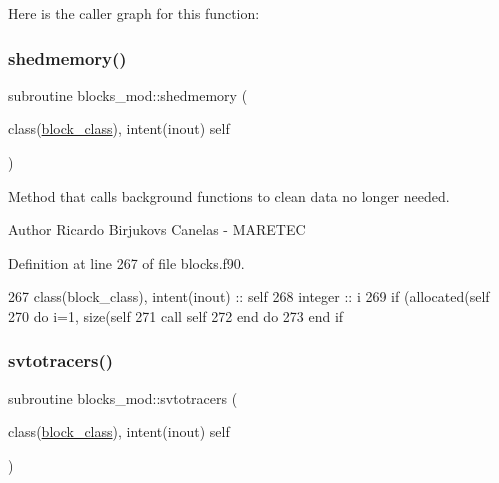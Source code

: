 Here is the caller graph for this function\+:
\mbox{\label{namespaceblocks__mod_a04a9fab577b0d1fb6cabefcde2b2180d}} 
\subsubsection{\texorpdfstring{shedmemory()}{shedmemory()}}
{\footnotesize\ttfamily subroutine blocks\+\_\+mod\+::shedmemory (\begin{DoxyParamCaption}\item[{class(\mbox{\hyperlink{structblocks__mod_1_1block__class}{block\+\_\+class}}), intent(inout)}]{self }\end{DoxyParamCaption})\hspace{0.3cm}{\ttfamily [private]}}



Method that calls background functions to clean data no longer needed. 

\begin{DoxyAuthor}{Author}
Ricardo Birjukovs Canelas -\/ M\+A\+R\+E\+T\+EC 
\end{DoxyAuthor}


Definition at line 267 of file blocks.\+f90.


\begin{DoxyCode}
267     \textcolor{keywordtype}{class}(block\_class), \textcolor{keywordtype}{intent(inout)} :: self
268     \textcolor{keywordtype}{integer} :: i
269     \textcolor{keywordflow}{if} (\textcolor{keyword}{allocated}(self%
270         \textcolor{keywordflow}{do} i=1, \textcolor{keyword}{size}(self%
271             \textcolor{keyword}{call }self%
272 \textcolor{keywordflow}{        end do}
273 \textcolor{keywordflow}{    end if}
\end{DoxyCode}
\mbox{\label{namespaceblocks__mod_a306a753acc9b8bb9107ebda481162180}} 
\subsubsection{\texorpdfstring{svtotracers()}{svtotracers()}}
{\footnotesize\ttfamily subroutine blocks\+\_\+mod\+::svtotracers (\begin{DoxyParamCaption}\item[{class(\mbox{\hyperlink{structblocks__mod_1_1block__class}{block\+\_\+class}}), intent(inout)}]{self }\end{DoxyParamCaption})\hspace{0.3cm}{\ttfamily [private]}}



